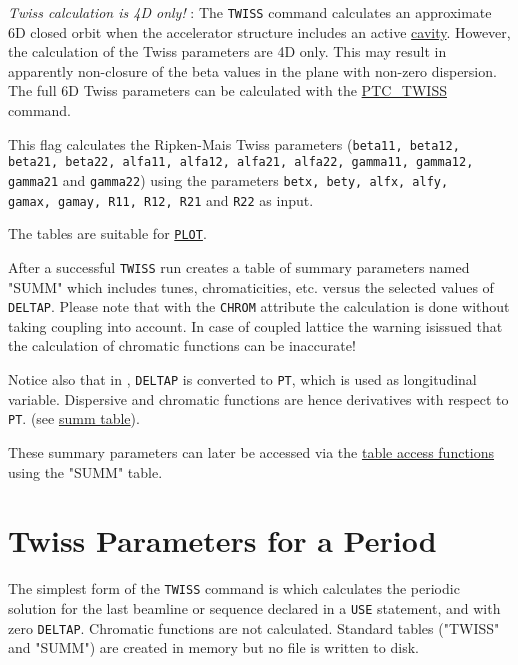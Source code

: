 \begin{madlist}
  \textit{ Twiss calculation is 4D only!} : The \texttt{TWISS}
  command calculates an approximate 6D closed orbit when the
  accelerator structure includes an active
  \hyperref[sec:rfcavity]{cavity}. However, the
  calculation of the Twiss parameters are 4D only. This may
  result in apparently non-closure of the beta values in the
  plane with non-zero dispersion. The full 6D Twiss parameters
  can be calculated with the
  \hyperref[chap:ptc-twiss]{PTC\_TWISS} command.    

   This flag calculates the Ripken-Mais Twiss
  parameters (\texttt{beta11, beta12, beta21, beta22, alfa11, alfa12,
  alfa21, alfa22, gamma11, gamma12, gamma21} and \texttt{gamma22}) using
  the parameters \texttt{betx, bety, alfx, alfy, \\ gamax, gamay, R11, R12,
    R21} and \texttt{R22} as input.  

\end{madlist}

The tables are suitable for \hyperref[chap:plot]{\texttt{PLOT}}.

After a successful \texttt{TWISS} run \madx creates a 
table of summary parameters named "SUMM" which includes tunes,
chromaticities, etc. versus the selected values of \texttt{DELTAP}.
Please note that with the \texttt{CHROM} attribute the calculation is done without
taking coupling into account. In case of coupled lattice the warning isissued that
the calculation of chromatic functions can be inaccurate!

Notice also that in \madx, \texttt{DELTAP} is converted to \texttt{PT},
which is used as longitudinal variable. 
Dispersive and chromatic functions are hence derivatives with
respect to \texttt{PT}. (see \hyperref[subsec:tables-summ]{summ table}). 

These summary parameters can later be accessed via the 
\hyperref[chap:tables]{table access functions} using the "SUMM" table.  

\section{Twiss Parameters for a Period}
\label{sec:twissperiod}

The simplest form of the \texttt{TWISS} command is
which calculates the periodic solution for the last beamline or sequence
declared in a \texttt{USE} statement, and with zero \texttt{DELTAP}.
Chromatic functions are not calculated. 
Standard tables ("TWISS" and "SUMM") are created in memory but no file
is written to disk. 

